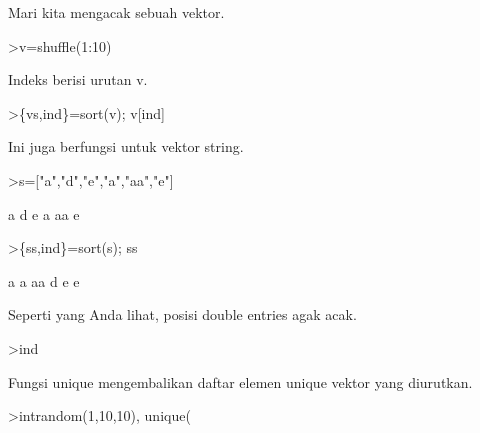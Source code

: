 \documentclass{article}
\begin{document}
\begin{eulernotebook}
\begin{eulercomment}
\begin{eulercomment}
\begin{eulercomment}
\begin{eulercomment}
\begin{eulercomment}
\begin{eulercomment}
\begin{eulercomment}
Mari kita mengacak sebuah vektor.
\end{eulercomment}
\begin{eulerprompt}
>v=shuffle(1:10)
\end{eulerprompt}
\begin{euleroutput}
  [4,  5,  10,  6,  8,  9,  1,  7,  2,  3]
\end{euleroutput}
\begin{eulercomment}
Indeks berisi urutan v.
\end{eulercomment}
\begin{eulerprompt}
>\{vs,ind\}=sort(v); v[ind]
\end{eulerprompt}
\begin{euleroutput}
  [1,  2,  3,  4,  5,  6,  7,  8,  9,  10]
\end{euleroutput}
\begin{eulercomment}
Ini juga berfungsi untuk vektor string.
\end{eulercomment}
\begin{eulerprompt}
>s=["a","d","e","a","aa","e"]
\end{eulerprompt}
\begin{euleroutput}
  a
  d
  e
  a
  aa
  e
\end{euleroutput}
\begin{eulerprompt}
>\{ss,ind\}=sort(s); ss
\end{eulerprompt}
\begin{euleroutput}
  a
  a
  aa
  d
  e
  e
\end{euleroutput}
\begin{eulercomment}
Seperti yang Anda lihat, posisi double entries agak acak.
\end{eulercomment}
\begin{eulerprompt}
>ind
\end{eulerprompt}
\begin{euleroutput}
  [4,  1,  5,  2,  6,  3]
\end{euleroutput}
\begin{eulercomment}
Fungsi unique mengembalikan daftar elemen unique vektor yang
diurutkan.
\end{eulercomment}
\begin{eulerprompt}
>intrandom(1,10,10), unique(%
\end{eulerprompt}
\begin{euleroutput}
  [4,  4,  9,  2,  6,  5,  10,  6,  5,  1]
  [1,  2,  4,  5,  6,  9,  10]
\end{euleroutput}
\begin{eulercomment}

\end{eulercomment}
\end{eulercomment}
\end{eulercomment}
\end{eulercomment}
\end{eulercomment}
\end{eulercomment}
\end{eulercomment}
\end{eulernotebook}
\end{document}
